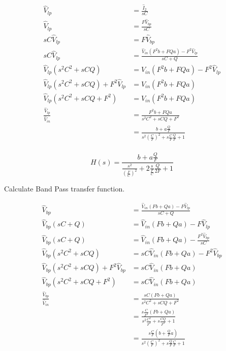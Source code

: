 \documentclass{article}
\begin{document}
\begin{equation*}
\begin{split}
  \hat{V}_{lp} & = \frac{\hat{I}_2}{sC} \\
  \hat{V}_{lp} & = \frac{F\hat{V}_{bp}}{sC} \\
  sC\hat{V}_{lp} & = F\hat{V}_{bp} \\
  sC\hat{V}_{lp} & = \frac{\hat{V}_{in}(F^2b + FQa) - F^2\hat{V}_{lp}}{sC + Q} \\
  \hat{V}_{lp}(s^2C^2 + sCQ) & = \hat{V}_{in}(F^2b + FQa) - F^2\hat{V}_{lp} \\
  \hat{V}_{lp}(s^2C^2 + sCQ) + F^2\hat{V}_{lp} & = \hat{V}_{in}(F^2b + FQa) \\
  \hat{V}_{lp}(s^2C^2 + sCQ + F^2) & = \hat{V}_{in}(F^2b + FQa) \\
  \frac{\hat{V}_{lp}}{\hat{V}_{in}} & = \frac{F^2b + FQa}{s^2C^2 + sCQ + F^2} \\
  & = \frac{b + a\frac{Q}{F}}{s^2{(\frac{C}{F})}^2 + s\frac{C}{F}\frac{Q}{F} + 1} \\
\end{split}
\end{equation*}

\begin{equation}
  H(s) = \frac{b + a\frac{Q}{F}}{\frac{s^2}{{(\frac{F}{C})}^2} + 2\frac{s}{\frac{F}{C}}\frac{Q}{2F} + 1}
\end{equation}

Calculate Band Pass transfer function.

\begin{equation*}
\begin{split}
  \hat{V}_{bp} & = \frac{\hat{V}_{in}(Fb + Qa) - F\hat{V}_{lp}}{sC + Q} \\
  \hat{V}_{bp}(sC + Q) & = \hat{V}_{in}(Fb + Qa) - F\hat{V}_{lp} \\
  \hat{V}_{bp}(sC + Q) & = \hat{V}_{in}(Fb + Qa) - \frac{F^2\hat{V}_{bp}}{sC} \\
  \hat{V}_{bp}(s^2C^2 + sCQ) & = sC\hat{V}_{in}(Fb + Qa) - F^2\hat{V}_{bp} \\
  \hat{V}_{bp}(s^2C^2 + sCQ) + F^2\hat{V}_{bp} & = sC\hat{V}_{in}(Fb + Qa) \\
  \hat{V}_{bp}(s^2C^2 + sCQ + F^2) & = sC\hat{V}_{in}(Fb + Qa) \\
  \frac{\hat{V}_{bp}}{\hat{V}_{in}} & = \frac{sC(Fb + Qa)}{s^2C^2 + sCQ + F^2} \\
  & = \frac{s\frac{C}{F^2}(Fb + Qa)}{s^2\frac{C^2}{F^2} + s\frac{CQ}{F^2} + 1} \\
  & = \frac{s\frac{C}{F}{(b + \frac{Q}{F}a)}}{s^2{(\frac{C}{F})}^2 + s\frac{Q}{F}\frac{C}{F} + 1} \\
\end{split}
\end{equation*}
\end{document}
